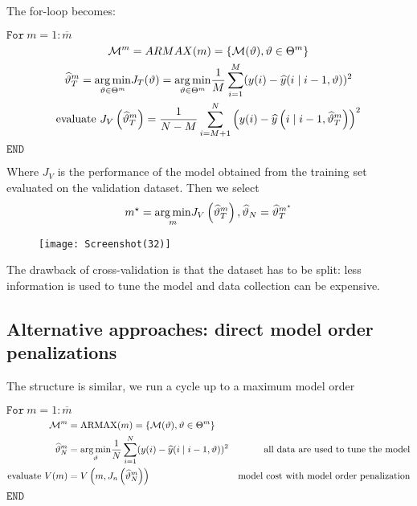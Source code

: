 The for-loop becomes:

$ \mathtt{For } \ m=1:\overline{m}$
\begin{gather*}
\mathcal{M}^{m} =ARMAX(m) =\left\{\mathcal{M}(\vartheta) ,\vartheta \in \Theta ^{m}\right\}\\
\widehat{\vartheta }_{T}^{m} =\underset{\vartheta \in \Theta ^{m}}{\operatorname*{arg\,min}} J_{T}(\vartheta) =\underset{\vartheta \in \Theta ^{m}}{\operatorname*{arg\,min}}\frac{1}{M}\sum _{i=1}^{M}(y(i) -\widehat{y}(i\mid i-1,\vartheta))^{2}\\
\text{evaluate } J_{V}\left(\widehat{\vartheta }_{T}^{m}\right) =\frac{1}{N-M}\sum _{i=M+1}^{N}\left(y(i) -\widehat{y}\left(i\mid i-1,\widehat{\vartheta }_{T}^{m}\right)\right)^{2}
\end{gather*}
$ \mathtt{END}$

Where $ J_{V}$ is the performance of the model obtained from the training set evaluated on the validation dataset. Then we select
\begin{equation*}
m^{\star} =\underset{m}{\operatorname*{arg\,min}} J_{V}\left(\widehat{\vartheta }_{T}^{m}\right) ,\widehat{\vartheta }_{N} =\widehat{\vartheta }_{T}^{m^{\star}}
\end{equation*}

\begin{figure}[htpb]
    \centering
    \texttt{[image: Screenshot(32)]}
\end{figure}
\FloatBarrier
The drawback of cross-validation is that the dataset has to be split: less information is used to tune the model and data collection can be expensive.


\subsection{Alternative approaches: direct model order penalizations}
The structure is similar, we run a cycle up to a maximum model order

$ \mathtt{For } \ m=1:\overline{m}$
\begin{equation*}
\begin{aligned}
\mathcal{M}^{m} & =\text{ARMAX}(m) =\left\{\mathcal{M}(\vartheta) ,\vartheta \in \Theta ^{m}\right\} & \\
\widehat{\vartheta }_{N}^{m}  & =\underset{\vartheta }{\operatorname*{arg\,min}}\frac{1}{N}\sum _{i=1}^{N}(y(i) -\widehat{y}(i\mid i-1,\vartheta))^{2} & \text{all data are used to tune the model}\\
\text{evaluate } V(m) & =V\left(m,J_{n}\left(\widehat{\vartheta }_{N}^{m}\right)\right) & \text{model cost with model order penalization}
\end{aligned}
\end{equation*}
$ \mathtt{END}$

